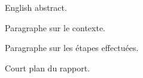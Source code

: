 \biabstract
{
    English abstract.
}
{
    Paragraphe sur le contexte.

    Paragraphe sur les étapes effectuées.

    Court plan du rapport.
}
